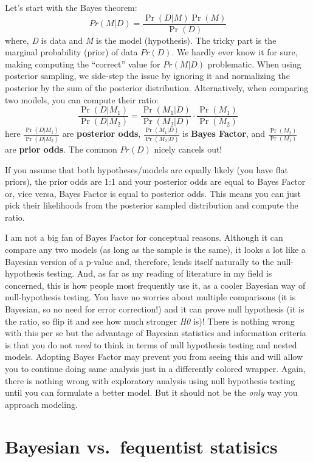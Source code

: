 \documentclass[
]{book}
\begin{document}
Let's start with the Bayes theorem:
\[Pr(M|D)=\frac {\Pr(D|M)\Pr(M)}{\Pr(D)}\]
where, \emph{D} is data and \emph{M} is the model (hypothesis). The tricky part is the marginal probability (prior) of data \(Pr(D)\). We hardly ever know it for sure, making computing the ``correct'' value for \(Pr(M|D)\) problematic. When using posterior sampling, we side-step the issue by ignoring it and normalizing the posterior by the sum of the posterior distribution. Alternatively, when comparing two models, you can compute their ratio:
\[{\frac {\Pr(D|M_{1})}{\Pr(D|M_{2})}}={\frac {\Pr(M_{1}|D)}{\Pr(M_{2}|D)}} \cdot {\frac {\Pr(M_{1})}{\Pr(M_{2})}}\]
here \(\frac{\Pr(D|M_{1})}{\Pr(D|M_{2})}\) are \textbf{posterior odds}, \(\frac {\Pr(M_{1}|D)}{\Pr(M_{2}|D)}\) is \textbf{Bayes Factor}, and \(\frac {\Pr(M_{2})}{\Pr(M_{1})}\) are \textbf{prior odds}. The common \(Pr(D)\) nicely cancels out!

If you assume that both hypotheses/models are equally likely (you have flat priors), the prior odds are 1:1 and your posterior odds are equal to Bayes Factor or, vice versa, Bayes Factor is equal to posterior odds. This means you can just pick their likelihoods from the posterior sampled distribution and compute the ratio.

I am not a big fan of Bayes Factor for conceptual reasons. Although it can compare any two models (as long as the sample is the same), it looks a lot like a Bayesian version of a p-value and, therefore, lends itself naturally to the null-hypothesis testing. And, as far as my reading of literature in my field is concerned, this is how people most frequently use it, as a cooler Bayesian way of null-hypothesis testing. You have no worries about multiple comparisons (it is Bayesian, so no need for error correction!) and it can prove null hypothesis (it is the ratio, so flip it and see how much stronger \emph{H0} is)! There is nothing wrong with this per se but the advantage of Bayesian statistics and information criteria is that you do not \emph{need} to think in terms of null hypothesis testing and nested models. Adopting Bayes Factor may prevent you from seeing this and will allow you to continue doing same analysis just in a differently colored wrapper. Again, there is nothing wrong with exploratory analysis using null hypothesis testing until you can formulate a better model. But it should not be the \emph{only} way you approach modeling.

\hypertarget{bayesian-vs.-fequentist-statisics}{%
\chapter{Bayesian vs.~fequentist statisics}\label{bayesian-vs.-fequentist-statisics}}
\end{document}
